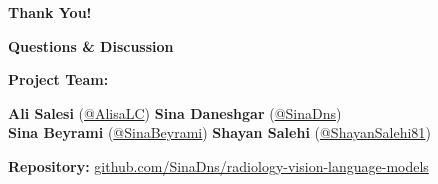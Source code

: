 \documentclass[aspectratio=169]{beamer}
\begin{document}
\begin{frame}
  \centering
  \vspace{1cm}
  {\Huge \textbf{Thank You!}}
  
  \vspace{0.5cm}
  {\Large \textbf{Questions \& Discussion}}
  
  \vspace{1cm}
  
  \textbf{Project Team:}
  
  \vspace{0.3cm}
  \begin{minipage}{0.8\textwidth}
    \centering
    \textbf{Ali Salesi} (\href{https://github.com/AlisaLC}{@AlisaLC}) \quad \textbf{Sina Daneshgar} (\href{https://github.com/SinaDns}{@SinaDns}) \\
    \vspace{0.2cm}
    \textbf{Sina Beyrami} (\href{https://github.com/SinaBeyrami}{@SinaBeyrami}) \quad \textbf{Shayan Salehi} (\href{https://github.com/ShayanSalehi81}{@ShayanSalehi81})
  \end{minipage}

  \vspace{0.5cm}
  \small \textbf{Repository:} \href{https://github.com/SinaDns/radiology-vision-language-models}{github.com/SinaDns/radiology-vision-language-models}
\end{frame}
\end{document}

